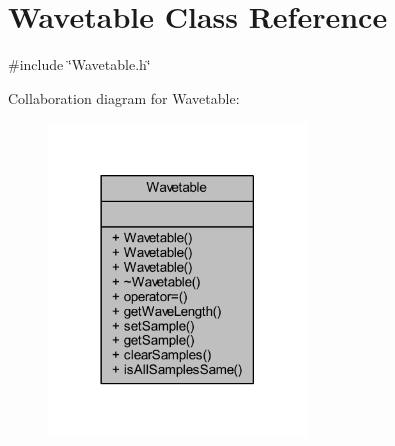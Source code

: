\hypertarget{class_wavetable}{}\section{Wavetable Class Reference}
\label{class_wavetable}


{\ttfamily \#include \char`\"{}Wavetable.\+h\char`\"{}}



Collaboration diagram for Wavetable\+:
\nopagebreak
\begin{figure}[H]
\begin{center}
\leavevmode
\includegraphics[width=194pt]{d7/d3d/class_wavetable__coll__graph}
\end{center}
\end{figure}
